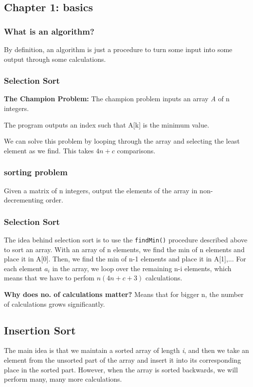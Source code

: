 \documentclass[portrait,10pt,a4paper]{article}
\begin{document}
\raggedright
\begin{multicols*}{3}
\section{Chapter 1: basics}

\subsubsection{What is an algorithm?}
By definition, an algorithm is just a procedure to turn some input into some output through some
calculations.

\subsubsection{Selection Sort}
\textbf{The Champion Problem:}
The champion problem inputs an array \textit{A} of n integers.

The program outputs an index such that A[k] is the minimum value.

We can solve this problem by looping through the array and selecting the least element as we find.
This takes $4n+c$ comparisons.
\subsubsection{sorting problem}
Given a matrix of n integers, output the elements of the array in non-decrementing order.
\subsubsection{Selection Sort}
The idea behind selection sort is to use the \texttt{findMin()} procedure described above to sort an array.
With an array of n elements, we find the min of n elements and place it in A[0]. Then, we find the min of 
n-1 elements and place it in A[1],... For each element $a_{i}$ in the array, we loop over the remaining
n-i elements, which means that we have to perfom $n(4n+c+3)$ calculations. 

\textbf{Why does no. of calculations matter?} Means that for bigger n, the number of calculations grows 
significantly.
\subsection{Insertion Sort}
The main idea is that we maintain a sorted array of length \textit{i}, and then we take an element from 
the unsorted part of the array and insert it into its corresponding place in the sorted part. However,
when the array is sorted backwards, we will perform many, many more calculations.


\end{multicols*}
\end{document}
